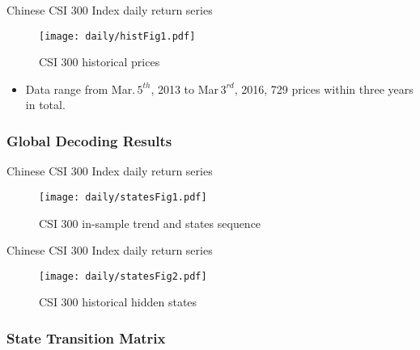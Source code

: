 \begin{frame}[fragile,t]{Chinese CSI 300 Index daily return series}
	\begin{figure}[!hbt]
    \center
    \texttt{[image: daily/histFig1.pdf]}
    \caption{CSI 300 historical prices}
    \label{fig:CSI:hist}
    \end{figure}

    \begin{itemize}
	\item Data range from Mar.\,$5^{th}$, 2013 to Mar\,$3^{rd}$, 2016, 
		729 prices within three years in total.
	\end{itemize}
\end{frame}

\subsubsection{Global Decoding Results}

\begin{frame}[fragile]{Chinese CSI 300 Index daily return series}
	\begin{figure}[!hbt]
    \center
    \texttt{[image: daily/statesFig1.pdf]}
    \caption{CSI 300 in-sample trend and states sequence}
    \label{fig:CSI:seqstates}
    \end{figure}
\end{frame}

\begin{frame}[fragile]{Chinese CSI 300 Index daily return series}
	\begin{figure}[!hbt]
    \center
    \texttt{[image: daily/statesFig2.pdf]}
    \caption{CSI 300 historical hidden states}
    \label{fig:CSI:states}
    \end{figure}
\end{frame}

\subsubsection{State Transition Matrix}

